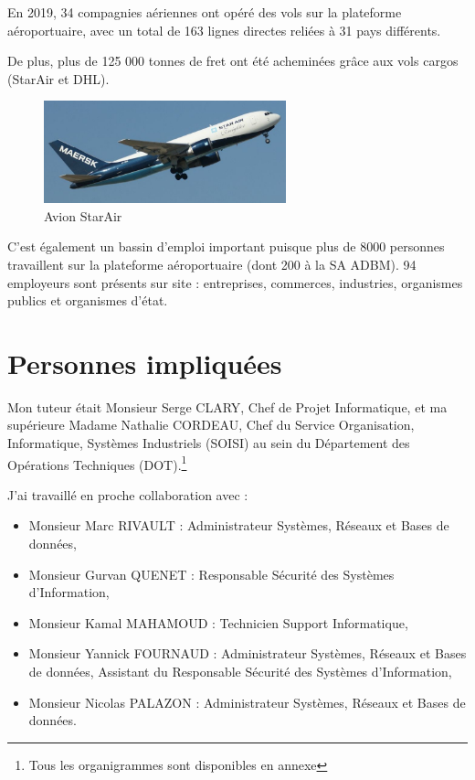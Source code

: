En 2019, 34 compagnies aériennes ont opéré des vols sur la plateforme aéroportuaire, avec un total de 163 lignes directes reliées à 31 pays différents.

De plus, plus de 125 000 tonnes de fret ont été acheminées grâce aux vols cargos (StarAir et DHL).

\begin{figure}[hbt!]
  \centering
  \includegraphics[width=7cm]{Images/starair.jpg}\newline
  \caption{Avion StarAir}
  \label{fig:starair}
\end{figure}

C'est également un bassin d'emploi important puisque plus de 8000 personnes travaillent sur la plateforme aéroportuaire (dont 200 à la SA ADBM). 94 employeurs sont présents sur site : entreprises, commerces, industries, organismes publics et organismes d'état.

\newpage

\section{Personnes impliquées}


Mon tuteur était Monsieur Serge CLARY, Chef de Projet Informatique, et ma supérieure Madame Nathalie CORDEAU, Chef du Service Organisation, Informatique, Systèmes Industriels (SOISI) au sein du Département des Opérations Techniques (DOT).\footnote{Tous les organigrammes sont disponibles en annexe}

J'ai travaillé en proche collaboration avec :

\begin{itemize}
    \item Monsieur Marc RIVAULT : Administrateur Systèmes, Réseaux et Bases de données,
    \item Monsieur Gurvan QUENET : Responsable Sécurité des Systèmes d'Information,
    \item Monsieur Kamal MAHAMOUD : Technicien Support Informatique,
    \item Monsieur Yannick FOURNAUD : Administrateur Systèmes, Réseaux et Bases de données, Assistant du Responsable Sécurité des Systèmes d'Information,
    \item Monsieur Nicolas PALAZON : Administrateur Systèmes, Réseaux et Bases de données.\newline
\end{itemize}

